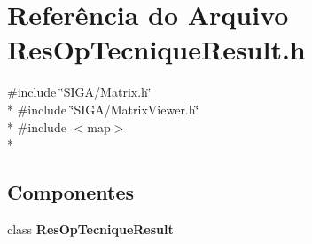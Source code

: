\section{Referência do Arquivo Res\+Op\+Tecnique\+Result.\+h}
\label{_tecniques_2_res_op_tecnique_result_8h}
{\ttfamily \#include \char`\"{}S\+I\+G\+A/\+Matrix.\+h\char`\"{}}\\*
{\ttfamily \#include \char`\"{}S\+I\+G\+A/\+Matrix\+Viewer.\+h\char`\"{}}\\*
{\ttfamily \#include $<$map$>$}\\*
\subsection*{Componentes}
\begin{DoxyCompactItemize}
\item 
class {\bf Res\+Op\+Tecnique\+Result}
\end{DoxyCompactItemize}

